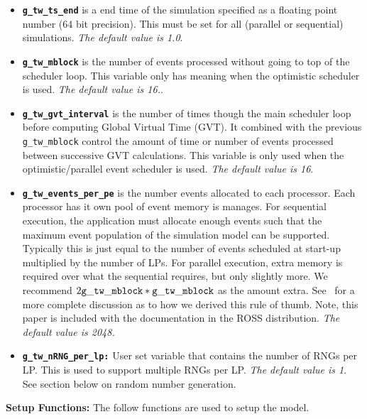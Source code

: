 \documentclass[12pt]{article}
\begin{document}
\begin{itemize}
\item {\tt\bf g\_tw\_ts\_end} is a end time of the simulation specified
as a floating point number (64 bit precision). This must be set for
all (parallel or sequential) simulations. {\em The default value is 1.0}.

\item {\tt\bf g\_tw\_mblock} is the number of events processed without
going to top of the scheduler loop. This variable only has meaning when
the optimistic scheduler is used. {\em The default value is 16.}.

\item {\tt\bf g\_tw\_gvt\_interval} is the number of times though the
main scheduler loop before computing Global Virtual Time (GVT). It
combined with the previous {\tt g\_tw\_mblock} control the amount of
time or number of events processed between successive GVT
calculations. This variable is only used when the optimistic/parallel
event scheduler is used. {\em The default value is 16}.

\item {\tt\bf g\_tw\_events\_per\_pe} is the number events allocated
to each processor. Each processor has it own pool of event memory is
manages. For sequential execution, the application must allocate
enough events such that the maximum event population of the simulation
model can be supported. Typically this is just equal to the number of
events scheduled at start-up multiplied by the number of LPs. For
parallel execution, extra memory is required over what the sequential
requires, but only slightly more. We recommend $2{\tt
g\_tw\_mblock}*{\tt g\_tw\_mblock}$ as the amount
extra. See~\cite{carothers-pads-2000} for a more complete discussion as
to how we derived this rule of thumb. Note, this paper is included with
the documentation in the ROSS distribution. {\em The default value
is 2048.}

\item {\tt\bf g\_tw\_nRNG\_per\_lp:} User set variable that contains
the number of RNGs per LP. This is used to support multiple RNGs per
LP. {\em The default value is 1}. See section below on random number
generation.

\end{itemize}

{\bf Setup Functions:} The follow functions are used to setup the
model.
\end{document}
